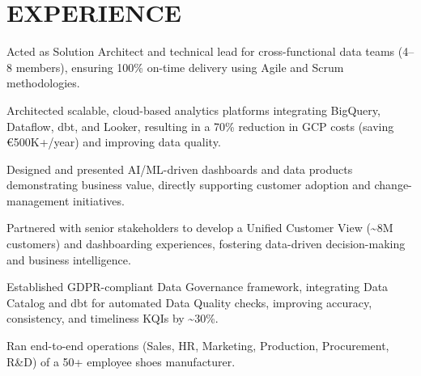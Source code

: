 \documentclass[]{deedy-resume-cv}
\begin{document}
\begin{minipage}[t]{0.60\textwidth}


\section{EXPERIENCE}

\vspace{\topsep} %
\begin{tightemize}
\item Acted as Solution Architect and technical lead for cross-functional data teams (4–8 members), ensuring 100\% on-time delivery using Agile and Scrum methodologies.

\item Architected scalable, cloud-based analytics platforms integrating BigQuery, Dataflow, dbt, and Looker, resulting in a 70\% reduction in GCP costs (saving €500K+/year) and improving data quality.

\item Designed and presented AI/ML-driven dashboards and data products demonstrating business value, directly supporting customer adoption and change-management initiatives.

\item Partnered with senior stakeholders to develop a Unified Customer View (\~{}8M customers) and dashboarding experiences, fostering data-driven decision-making and business intelligence.

\item Established GDPR-compliant Data Governance framework, integrating Data Catalog and dbt for automated Data Quality checks, improving accuracy, consistency, and timeliness KQIs by \~{}30\%.
\end{tightemize}

\sectionsep
{}
\begin{tightemize}
\item Ran end-to-end operations (Sales, HR, Marketing, Production, Procurement, R\&D) of a 50+ employee shoes manufacturer.


\end{tightemize}
\end{minipage}
\end{document}

